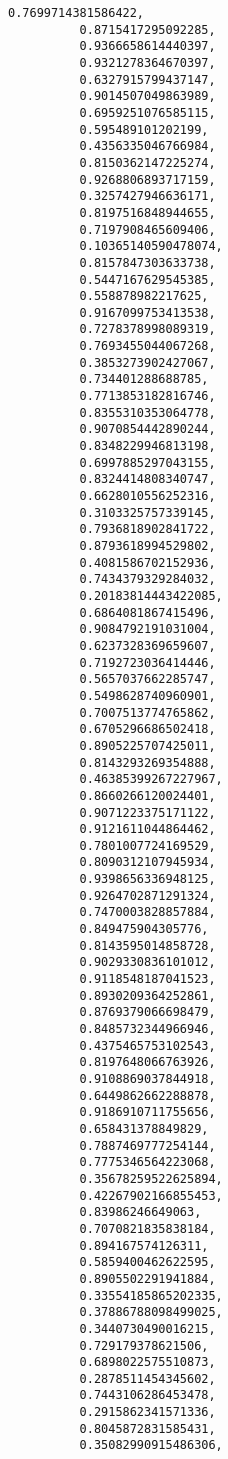 \documentclass[11pt]{article}
\begin{document}
\begin{Verbatim}[commandchars=\\\{\}]
          0.7699714381586422,
          0.8715417295092285,
          0.9366658614440397,
          0.9321278364670397,
          0.6327915799437147,
          0.9014507049863989,
          0.6959251076585115,
          0.595489101202199,
          0.4356335046766984,
          0.8150362147225274,
          0.9268806893717159,
          0.3257427946636171,
          0.8197516848944655,
          0.7197908465609406,
          0.10365140590478074,
          0.8157847303633738,
          0.5447167629545385,
          0.558878982217625,
          0.9167099753413538,
          0.7278378998089319,
          0.7693455044067268,
          0.3853273902427067,
          0.734401288688785,
          0.7713853182816746,
          0.8355310353064778,
          0.9070854442890244,
          0.8348229946813198,
          0.6997885297043155,
          0.8324414808340747,
          0.6628010556252316,
          0.3103325757339145,
          0.7936818902841722,
          0.8793618994529802,
          0.4081586702152936,
          0.7434379329284032,
          0.20183814443422085,
          0.6864081867415496,
          0.9084792191031004,
          0.6237328369659607,
          0.7192723036414446,
          0.5657037662285747,
          0.5498628740960901,
          0.7007513774765862,
          0.6705296686502418,
          0.8905225707425011,
          0.8143293269354888,
          0.46385399267227967,
          0.8660266120024401,
          0.9071223375171122,
          0.9121611044864462,
          0.7801007724169529,
          0.8090312107945934,
          0.9398656336948125,
          0.9264702871291324,
          0.7470003828857884,
          0.849475904305776,
          0.8143595014858728,
          0.9029330836101012,
          0.9118548187041523,
          0.8930209364252861,
          0.8769379066698479,
          0.8485732344966946,
          0.4375465753102543,
          0.8197648066763926,
          0.9108869037844918,
          0.6449862662288878,
          0.9186910711755656,
          0.658431378849829,
          0.7887469777254144,
          0.7775346564223068,
          0.35678259522625894,
          0.42267902166855453,
          0.83986246649063,
          0.7070821835838184,
          0.894167574126311,
          0.5859400462622595,
          0.8905502291941884,
          0.33554185865202335,
          0.37886788098499025,
          0.3440730490016215,
          0.729179378621506,
          0.6898022575510873,
          0.2878511454345602,
          0.7443106286453478,
          0.2915862341571336,
          0.8045872831585431,
          0.35082990915486306,

\end{Verbatim}
\end{document}
